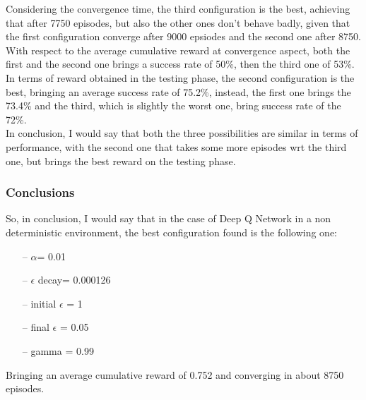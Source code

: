 \documentclass{article}
\begin{document}
\clearpage


Considering the convergence time, the third configuration is the best, achieving that after 7750 episodes, but also the other ones don't behave badly, given that the first configuration converge after 
9000 epsiodes and the second one after 8750.
\\
With respect to the average cumulative reward at convergence aspect, both the first and the second one brings a success rate of 50\%, then the third one of 53\%.
\\
In terms of reward obtained in the testing phase, the second configuration is the best, bringing an average success rate of 75.2\%, instead, the first one brings the 73.4\% and the third,
which is slightly the worst one, bring success rate of the 72\%.
\\
In conclusion, I would say that both the three possibilities are similar in terms of performance, with the second one that takes some more episodes wrt the third one, but brings the best reward on the testing phase.


\subsubsection{Conclusions}

So, in conclusion, I would say that in the case of Deep Q Network in a non deterministic environment, the best configuration found is the following one:
\begin{itemize}
\item[--] $\alpha$= 0.01
\item[--] $\epsilon$ decay= 0.000126
\item[--] initial $\epsilon$ = 1
\item[--] final $\epsilon$ = 0.05
\item[--] gamma = 0.99
\end{itemize}

Bringing an average cumulative reward of 0.752 and converging in about 8750 episodes.
\end{document}
